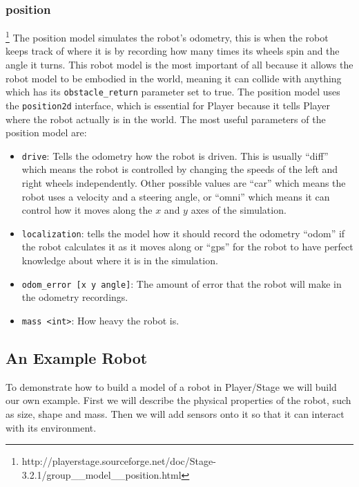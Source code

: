 \documentclass[a4paper]{report}
\newcommand{\plst}{Player/Stage\xspace}
\newcommand{\pl}{Player\xspace}
\begin{document}
\subsubsection{position}\footnote{http://playerstage.sourceforge.net/doc/Stage-3.2.1/group\_\_model\_\_position.html}\label{sec:position}
The position model simulates the robot's odometry, this is when the robot keeps track of where it is by recording how many times its wheels spin and the angle it turns. This robot model is the most important of all because it allows the robot model to be embodied in the world, meaning it can collide with anything which has its \verb|obstacle_return| parameter set to true. The position model uses the \verb|position2d| interface, which is essential for \pl because it tells \pl where the robot actually is in the world.
The most useful parameters of the position model are:
\begin{itemize}
\item \verb|drive|: Tells the odometry how the robot is driven. This is usually ``diff'' which means the robot is controlled by changing the speeds of the left and right wheels independently. Other possible values are ``car'' which means the robot uses a velocity and a steering angle, or ``omni'' which means it can control how it moves along the $x$ and $y$ axes of the simulation.
\item \verb|localization|: tells the model how it should record the odometry ``odom'' if the robot calculates it as it moves along or ``gps'' for the robot to have perfect knowledge about where it is in the simulation. 
\item \verb|odom_error [x y angle]|: The amount of error that the robot will make in the odometry recordings.
\item \verb|mass <int>|: How heavy the robot is.
\end{itemize}


\subsection{An Example Robot} \label{sec:exampleRobot}

To demonstrate how to build a model of a robot in \plst we will build our own example. First we will describe the physical properties of the robot, such as size, shape and mass. Then we will add sensors onto it so that it can interact with its environment.
\end{document}

